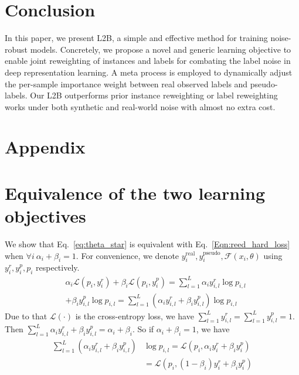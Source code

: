\documentclass{article}
\begin{document}
\section{Conclusion}
In this paper, we present L2B, a simple and effective method for training noise-robust models. 
Concretely, we propose a novel and generic learning objective to enable joint reweighting of instances and labels for combating the label noise in deep representation learning. A meta process is employed to dynamically adjust the per-sample importance weight between real observed labels and pseudo-labels.
Our L2B outperforms prior instance reweighting or label reweighting works under both synthetic and real-world noise with almost no extra cost. 






\clearpage
\appendix

\section*{Appendix}

\section{Equivalence of the two learning objectives}
We show that Eq.~\eqref{eq:theta_star} is equivalent with Eq.~\eqref{Eqn:reed_hard_loss} when $\forall i\  \alpha_i+\beta_i=1$. For convenience, we denote $y_i^{\text{real}},y_i^{\text{pseudo}},\mathcal{F}(x_i,\theta)$ using $y_i^r,y_i^p,p_i$ respectively. 
\begin{align}
&\alpha_i\mathcal{L}(p_i,y_i^r)+\beta_i\mathcal{L}(p_i,y_i^p)=\sum_{l=1}^L\alpha_i y_{i,l}^r\log p_{i,l}\\&+\beta_i y_{i,l}^p\log p_{i,l} 
=\sum_{l=1}^L(\alpha_i y_{i,l}^r+\beta_i y_{i,l}^p)\log p_{i,l}
\end{align}
Due to that $\mathcal{L}(\cdot)$ is the cross-entropy loss, we have $\sum_{l=1}^L y_{i,l}^r=\sum_{l=1}^L y_{i,l}^p=1$. Then $\sum_{l=1}^L\alpha_i y_{i,l}^r+\beta_i y_{i,l}^p=\alpha_i+\beta_i$. So if $\alpha_i+\beta_i=1$, we have 
\begin{align}
\sum_{l=1}^L(\alpha_i y_{i,l}^r+\beta_i y_{i,l}^p)&\log p_{i,l}=\mathcal{L}(p_i,\alpha_i y_i^r+\beta_i y_i^p)\\
&=\mathcal{L}(p_i,(1-\beta_i) y_i^r+\beta_i y_i^p)
\end{align}
\end{document}

